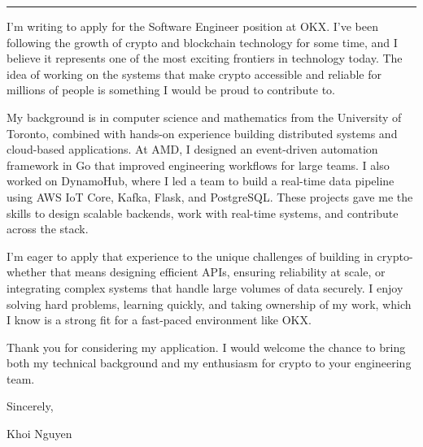\documentclass[
	12pt, %
]{resume} %
\begin{document}
    \medskip
    \hrule %
    \medskip

I'm writing to apply for the Software Engineer position at OKX. I've been following the growth of crypto and blockchain technology for some time, and I believe it represents one of the most exciting frontiers in technology today. The idea of working on the systems that make crypto accessible and reliable for millions of people is something I would be proud to contribute to.

My background is in computer science and mathematics from the University of Toronto, combined with hands-on experience building distributed systems and cloud-based applications. At AMD, I designed an event-driven automation framework in Go that improved engineering workflows for large teams. I also worked on DynamoHub, where I led a team to build a real-time data pipeline using AWS IoT Core, Kafka, Flask, and PostgreSQL. These projects gave me the skills to design scalable backends, work with real-time systems, and contribute across the stack.

I'm eager to apply that experience to the unique challenges of building in crypto-whether that means designing efficient APIs, ensuring reliability at scale, or integrating complex systems that handle large volumes of data securely. I enjoy solving hard problems, learning quickly, and taking ownership of my work, which I know is a strong fit for a fast-paced environment like OKX.

Thank you for considering my application. I would welcome the chance to bring both my technical background and my enthusiasm for crypto to your engineering team.

Sincerely,

Khoi Nguyen
\end{document}
